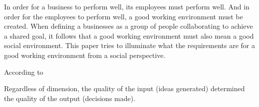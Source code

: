 %
%

%
%

In order for a business to perform well, its employees must perform well. And in order for the employees to perform well, a good working environment must be created. When defining a businesses as a group of people collaborating to achieve a shared goal, it follows that a good working environment must also mean a good social environment. This paper tries to illuminate what the requirements are for a good working environment from a social perspective.

%
%

According to \cite{WirthTurchanZimmermanBernstein2014} 

%
%

Regardless of dimension, the quality of the input (ideas generated) determined the quality of the output (decisions made).

%
%


